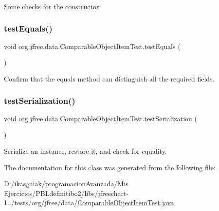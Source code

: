 Some checks for the constructor. \mbox{\label{classorg_1_1jfree_1_1data_1_1_comparable_object_item_test_a0fe6a38bb11452f93f83ab2d34b5f51d}} 
\subsubsection{\texorpdfstring{test\+Equals()}{testEquals()}}
{\footnotesize\ttfamily void org.\+jfree.\+data.\+Comparable\+Object\+Item\+Test.\+test\+Equals (\begin{DoxyParamCaption}{ }\end{DoxyParamCaption})}

Confirm that the equals method can distinguish all the required fields. \mbox{\label{classorg_1_1jfree_1_1data_1_1_comparable_object_item_test_a0ffcd03d6c8ce53e8bb86aa61cb74707}} 
\subsubsection{\texorpdfstring{test\+Serialization()}{testSerialization()}}
{\footnotesize\ttfamily void org.\+jfree.\+data.\+Comparable\+Object\+Item\+Test.\+test\+Serialization (\begin{DoxyParamCaption}{ }\end{DoxyParamCaption})}

Serialize an instance, restore it, and check for equality. 

The documentation for this class was generated from the following file\+:\begin{DoxyCompactItemize}
\item 
D\+:/ikasgaiak/programacion\+Avanzada/\+Mis Ejercicios/\+P\+B\+Ldefinitibo2/libs/jfreechart-\/1../tests/org/jfree/data/\mbox{\hyperlink{_comparable_object_item_test_8java}{Comparable\+Object\+Item\+Test.\+java}}\end{DoxyCompactItemize}
